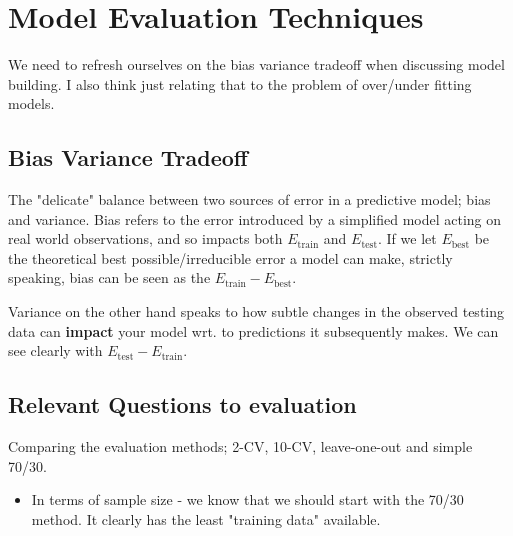 \documentclass{article}
\begin{document}
\section{Model Evaluation Techniques}
We need to refresh ourselves on the bias variance tradeoff when discussing model building. I also think just relating that to the problem of over/under fitting models.

\subsection{Bias Variance Tradeoff}
The "delicate" balance between two sources of error in a predictive model; bias and variance. Bias refers to the error introduced by a simplified model acting on real world observations, and so impacts both $E_{\text{train}}$ and $E_{\text{test}}$. If we let $E_{\text{best}}$ be the theoretical best possible/irreducible error a model can make, strictly speaking, bias can be seen as the $E_{\text{train}} - E_{\text{best}}$.

Variance on the other hand speaks to how subtle changes in the observed testing data can {\bf impact} your model wrt. to predictions it subsequently makes. We can see clearly with $E_{\text{test}} - E_{\text{train}}$.

\subsection{Relevant Questions to evaluation}
Comparing the evaluation methods; 2-CV, 10-CV, leave-one-out and simple 70/30.
\begin{itemize}
	\item In terms of sample size - we know that we should start with the 70/30 method. It clearly has the least "training data" available.

\end{itemize}
\end{document}
